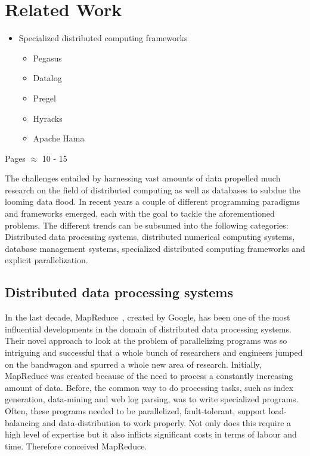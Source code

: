 \chapter{Related Work}
\label{cha:relatedwork}

\begin{itemize}
	\item Specialized distributed computing frameworks
	\begin{itemize}
		\item Pegasus
		\item Datalog
		\item Pregel
		\item Hyracks
		\item Apache Hama
	\end{itemize}
\end{itemize}

Pages $\approx$ 10 - 15

The challenges entailed by harnessing vast amounts of data propelled much research on the field of distributed computing as well as databases to subdue the looming data flood.
In recent years a couple of different programming paradigms and frameworks emerged, each with the goal to tackle the aforementioned problems.
The different trends can be subsumed into the following categories: Distributed data processing systems, distributed numerical computing systems, database management systems, specialized distributed computing frameworks and explicit parallelization.

\section{Distributed data processing systems}

In the last decade, MapReduce~\cite{dean:c2008a}, created by Google, has been one of the most influential developments in the domain of distributed data processing systems.
Their novel approach to look at the problem of parallelizing programs was so intriguing and successful that a whole bunch of researchers and engineers jumped on the bandwagon and spurred a whole new area of research.
Initially, MapReduce was created because of the need to process a constantly increasing amount of data.
Before, the common way to do processing tasks, such as index generation, data-mining and web log parsing, was to write specialized programs.
Often, these programs needed to be parallelized, fault-tolerant, support load-balancing and data-distribution to work properly.
Not only does this require a high level of expertise but it also inflicts significant costs in terms of labour and time.
Therefore \citeauthor{dean:c2008a} conceived MapReduce.

